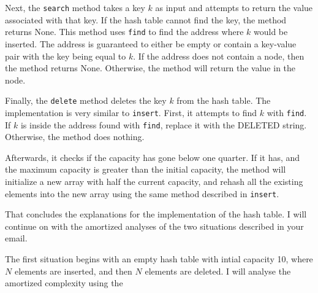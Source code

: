 \documentclass[11pt]{article}
\begin{document}
    Next, the \texttt{search} method takes a key \(k\) as input and attempts to return the value associated with that key. If the hash table cannot find the key, the method returns None. This method uses \texttt{find} to find the address where \(k\) would be inserted. The address is guaranteed to either be empty or contain a key-value pair with the key being equal to \(k\). If the address does not contain a node, then the method returns None. Otherwise, the method will return the value in the node.

    Finally, the \texttt{delete} method deletes the key \(k\) from the hash table. The implementation is very similar to \texttt{insert}. First, it attempts to find \(k\) with \texttt{find}. If \(k\) is inside the address found with \texttt{find}, replace it with the DELETED string. Otherwise, the method does nothing.

    Afterwards, it checks if the capacity has gone below one quarter. If it has, and the maximum capacity is greater than the initial capacity, the method will initialize a new array with half the current capacity, and rehash all the existing elements into the new array using the same method described in \texttt{insert}.

    That concludes the explanations for the implementation of the hash table. I will continue on with the amortized analyses of the two situations described in your email.

    The first situation begins with an empty hash table with intial capacity 10, where \(N\) elements are inserted, and then \(N\) elements are deleted. I will analyse the amortized complexity using the 
\end{document}
